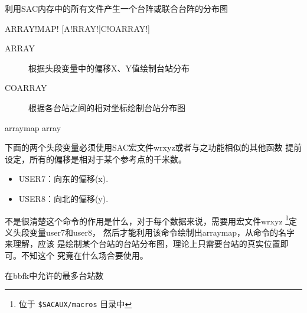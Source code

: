 \label{cmd:arraymap}

利用SAC内存中的所有文件产生一个台阵或联合台阵的分布图

\begin{SACSTX}
ARRAY!MAP! [A!RRAY!|C!OARRAY!]
\end{SACSTX}

\begin{description}
\item [ARRAY] 根据头段变量中的偏移X、Y值绘制台站分布
\item [COARRAY] 根据各台站之间的相对坐标绘制台站分布图
\end{description}

\begin{SACDFT}
arraymap array
\end{SACDFT}

下面的两个头段变量必须使用SAC宏文件wrxyz或者与之功能相似的其他函数
提前设定，所有的偏移是相对于某个参考点的千米数。
\begin{itemize}
\item USER7：向东的偏移(x).
\item USER8：向北的偏移(y).
\end{itemize}

不是很清楚这个命令的作用是什么，对于每个数据来说，需要用宏文件wrxyz
\footnote{位于 \verb|$SACAUX/macros| 目录中}定义头段变量user7和user8，
然后才能利用该命令绘制出arraymap，从命令的名字来理解，应该
是绘制某个台站的台站分布图，理论上只需要台站的真实位置即可。不知这个
究竟在什么场合要使用。

在bbfk中允许的最多台站数
